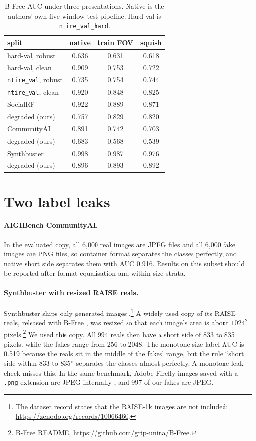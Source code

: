 \documentclass[letterpaper]{article} %
\begin{document}
\begin{table}[t]
\centering
\small
\setlength{\tabcolsep}{4pt}
\begin{tabular}{lccc}
\toprule
split & native & train FOV & squish \\
\midrule
hard-val, robust & 0.636 & 0.631 & 0.618 \\
hard-val, clean & 0.909 & 0.753 & 0.722 \\
\texttt{ntire\_val}, robust & 0.735 & 0.754 & 0.744 \\
\texttt{ntire\_val}, clean & 0.920 & 0.848 & 0.825 \\
\midrule
SocialRF & 0.922 & 0.889 & 0.871 \\
\quad degraded (ours) & 0.757 & 0.829 & 0.820 \\
CommunityAI & 0.891 & 0.742 & 0.703 \\
\quad degraded (ours) & 0.683 & 0.568 & 0.539 \\
Synthbuster & 0.998 & 0.987 & 0.976 \\
\quad degraded (ours) & 0.896 & 0.893 & 0.892 \\
\bottomrule
\end{tabular}
\caption{B-Free AUC under three presentations. Native is the authors' own
five-window test pipeline. Hard-val is \texttt{ntire\_val\_hard}.}
\label{tab:public}
\end{table}

\section{Two label leaks}
\label{sec:leaks}

\paragraph{AIGIBench CommunityAI.} In the evaluated copy, all 6,000 real images are JPEG files and all
6,000 fake images are PNG files, so container format separates the classes
perfectly, and native short side separates them with AUC 0.916. Results on this
subset should be reported after format equalisation and within size strata.

\paragraph{Synthbuster with resized RAISE reals.} Synthbuster ships only
generated images \cite{bammey2024synthbuster}.\footnote{The dataset record
states that the RAISE-1k images are not included:
\url{https://zenodo.org/records/10066460}.} A widely used copy of its RAISE
reals, released with B-Free \cite{guillaro2025bfree}, was resized so that
each image's area is about $1024^2$ pixels.\footnote{B-Free README,
\url{https://github.com/grip-unina/B-Free}.} We used this copy. All 994 reals
then have a short side of 833 to 835 pixels, while the fakes range from 256
to 2048. The monotone size-label AUC is 0.519 because the reals sit in the
middle of the fakes' range, but the rule ``short side within 833 to 835''
separates the classes almost perfectly. A monotone leak check misses this. In
the same benchmark, Adobe Firefly images saved with a \texttt{.png} extension
are JPEG internally \cite{ricker2026biasid}, and 997 of our fakes are JPEG.
\end{document}
